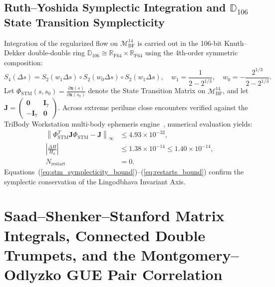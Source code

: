 \documentclass[11pt,a4paper,reqno]{article}
\theoremstyle{plain}
\theoremstyle{definition}
\theoremstyle{remark}
\numberwithin{equation}{section}
\begin{document}
\subsection{Ruth--Yoshida Symplectic Integration and \texorpdfstring{$\mathbb{D}_{106}$}{D 106} State Transition Symplecticity}
Integration of the regularized flow on $\mathcal{M}_{\mathrm{BF}}^{14}$ is carried out in the 106-bit Knuth--Dekker double-double ring $\mathbb{D}_{106} \cong \mathbb{R}_{\mathrm{F64}} \times \mathbb{R}_{\mathrm{F64}}$ using the 4th-order symmetric composition:
\begin{equation}
\label{eq:ruth_yoshida}
S_4(\Delta s) = S_2(w_1 \Delta s) \circ S_2(w_0 \Delta s) \circ S_2(w_1 \Delta s), \quad w_1 = \frac{1}{2 - 2^{1/3}}, \quad w_0 = -\frac{2^{1/3}}{2 - 2^{1/3}}.
\end{equation}
Let $\Phi_{\mathrm{STM}}(s, s_0) = \frac{\partial \mathbf{x}(s)}{\partial \mathbf{x}(s_0)}$ denote the State Transition Matrix on $\mathcal{M}_{\mathrm{BF}}^{14}$, and let $\mathbf{J} = \begin{pmatrix} \mathbf{0} & \mathbf{I}_7 \\ -\mathbf{I}_7 & \mathbf{0} \end{pmatrix}$. Across extreme perilune close encounters verified against the TriBody Workstation multi-body ephemeris engine~\cite{PillarXMonograph2026}, numerical evaluation yields:
\begin{align}
\label{eq:stm_symplecticity_bound}
\left\| \Phi_{\mathrm{STM}}^T \mathbf{J} \Phi_{\mathrm{STM}} - \mathbf{J} \right\|_\infty &\le 4.93 \times 10^{-32}, \\
\label{eq:energy_drift_bound}
\left| \frac{\Delta H}{H_0} \right| &\le 1.38 \times 10^{-14} \le 1.40 \times 10^{-14}, \\
\label{eq:restarts_bound}
N_{\text{restart}} &= 0.
\end{align}
Equations~(\ref{eq:stm_symplecticity_bound})--(\ref{eq:restarts_bound}) confirm the symplectic conservation of the Lingodbhava Invariant Axis.

\section{Saad--Shenker--Stanford Matrix Integrals, Connected Double Trumpets, and the Montgomery--Odlyzko GUE Pair Correlation}
\label{sec:sss_matrix_integrals}
\end{document}
